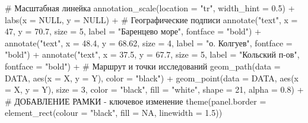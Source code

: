\documentclass[
  letterpaper,
  DIV=11,
  numbers=noendperiod]{scrreprt}
\newenvironment{Shaded}{\begin{snugshade}}{\end{snugshade}}
\newcommand{\AttributeTok}[1]{\textcolor[rgb]{0.40,0.45,0.13}{#1}}
\newcommand{\CommentTok}[1]{\textcolor[rgb]{0.37,0.37,0.37}{#1}}
\newcommand{\ConstantTok}[1]{\textcolor[rgb]{0.56,0.35,0.01}{#1}}
\newcommand{\DecValTok}[1]{\textcolor[rgb]{0.68,0.00,0.00}{#1}}
\newcommand{\FloatTok}[1]{\textcolor[rgb]{0.68,0.00,0.00}{#1}}
\newcommand{\FunctionTok}[1]{\textcolor[rgb]{0.28,0.35,0.67}{#1}}
\newcommand{\NormalTok}[1]{\textcolor[rgb]{0.00,0.23,0.31}{#1}}
\newcommand{\SpecialCharTok}[1]{\textcolor[rgb]{0.37,0.37,0.37}{#1}}
\newcommand{\StringTok}[1]{\textcolor[rgb]{0.13,0.47,0.30}{#1}}
\begin{document}
\begin{Shaded}
\begin{Highlighting}[]
  \CommentTok{\# Масштабная линейка}
  \FunctionTok{annotation\_scale}\NormalTok{(}\AttributeTok{location =} \StringTok{"tr"}\NormalTok{, }\AttributeTok{width\_hint =} \FloatTok{0.5}\NormalTok{) }\SpecialCharTok{+}
  \FunctionTok{labs}\NormalTok{(}\AttributeTok{x =} \ConstantTok{NULL}\NormalTok{, }\AttributeTok{y =} \ConstantTok{NULL}\NormalTok{) }\SpecialCharTok{+}
  \CommentTok{\# Географические подписи}
  \FunctionTok{annotate}\NormalTok{(}\StringTok{"text"}\NormalTok{, }\AttributeTok{x =} \DecValTok{47}\NormalTok{, }\AttributeTok{y =} \FloatTok{70.7}\NormalTok{, }\AttributeTok{size =} \DecValTok{5}\NormalTok{, }
           \AttributeTok{label =} \StringTok{"Баренцево море"}\NormalTok{, }\AttributeTok{fontface =} \StringTok{"bold"}\NormalTok{) }\SpecialCharTok{+}
  \FunctionTok{annotate}\NormalTok{(}\StringTok{"text"}\NormalTok{, }\AttributeTok{x =} \FloatTok{48.4}\NormalTok{, }\AttributeTok{y =} \FloatTok{68.62}\NormalTok{, }\AttributeTok{size =} \DecValTok{4}\NormalTok{,}
           \AttributeTok{label =} \StringTok{"о. Колгуев"}\NormalTok{, }\AttributeTok{fontface =} \StringTok{"bold"}\NormalTok{) }\SpecialCharTok{+}
  \FunctionTok{annotate}\NormalTok{(}\StringTok{"text"}\NormalTok{, }\AttributeTok{x =} \FloatTok{37.5}\NormalTok{, }\AttributeTok{y =} \FloatTok{67.7}\NormalTok{, }\AttributeTok{size =} \DecValTok{5}\NormalTok{,}
           \AttributeTok{label =} \StringTok{"Кольский п{-}ов"}\NormalTok{, }\AttributeTok{fontface =} \StringTok{"bold"}\NormalTok{) }\SpecialCharTok{+}
  \CommentTok{\# Маршрут и точки исследований}
  \FunctionTok{geom\_path}\NormalTok{(}\AttributeTok{data =}\NormalTok{ DATA, }\FunctionTok{aes}\NormalTok{(}\AttributeTok{x =}\NormalTok{ X, }\AttributeTok{y =}\NormalTok{ Y), }\AttributeTok{color =} \StringTok{"black"}\NormalTok{) }\SpecialCharTok{+}
  \FunctionTok{geom\_point}\NormalTok{(}\AttributeTok{data =}\NormalTok{ DATA, }\FunctionTok{aes}\NormalTok{(}\AttributeTok{x =}\NormalTok{ X, }\AttributeTok{y =}\NormalTok{ Y), }
             \AttributeTok{size =} \DecValTok{3}\NormalTok{, }\AttributeTok{color =} \StringTok{"black"}\NormalTok{, }\AttributeTok{fill =} \StringTok{"white"}\NormalTok{, }
             \AttributeTok{shape =} \DecValTok{21}\NormalTok{, }\AttributeTok{alpha =} \FloatTok{0.8}\NormalTok{) }\SpecialCharTok{+}
  \CommentTok{\# ДОБАВЛЕНИЕ РАМКИ {-} ключевое изменение}
  \FunctionTok{theme}\NormalTok{(}\AttributeTok{panel.border =} \FunctionTok{element\_rect}\NormalTok{(}\AttributeTok{colour =} \StringTok{"black"}\NormalTok{, }\AttributeTok{fill =} \ConstantTok{NA}\NormalTok{, }\AttributeTok{linewidth =} \FloatTok{1.5}\NormalTok{))}


\end{Highlighting}
\end{Shaded}
\end{document}
